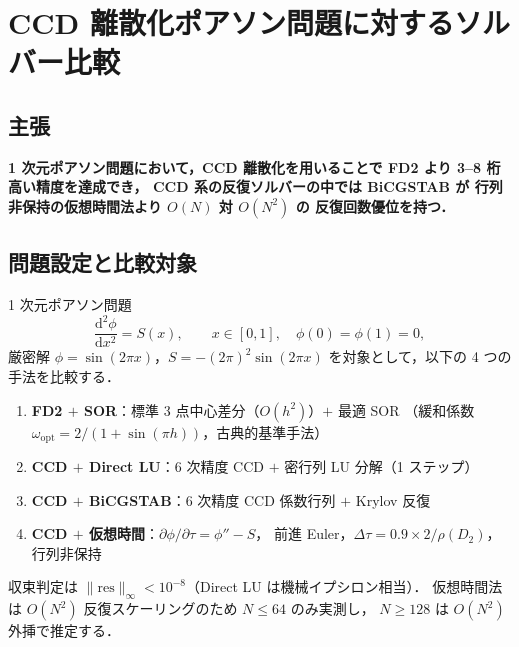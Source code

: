 %

\section{CCD 離散化ポアソン問題に対するソルバー比較}
\label{app:ccd_solver_benchmark}

\subsection{主張}

\begin{center}
\textbf{%
  1 次元ポアソン問題において，CCD 離散化を用いることで%
  FD2 より 3--8 桁高い精度を達成でき，%
  CCD 系の反復ソルバーの中では BiCGSTAB が%
  行列非保持の仮想時間法より $O(N)$ 対 $O(N^2)$ の%
  反復回数優位を持つ．}
\end{center}

\subsection{問題設定と比較対象}

1 次元ポアソン問題
\begin{equation}
  \frac{\mathrm{d}^2\phi}{\mathrm{d}x^2} = S(x),
  \qquad x \in [0,1],\quad \phi(0)=\phi(1)=0,
  \label{eq:bench_poisson}
\end{equation}
厳密解 $\phi = \sin(2\pi x)$，$S = -(2\pi)^2\sin(2\pi x)$
を対象として，以下の 4 つの手法を比較する．

\begin{enumerate}
  \item \textbf{FD2 $+$ SOR}：標準 3 点中心差分（$O(h^2)$）$+$ 最適 SOR
        （緩和係数 $\omega_{\mathrm{opt}} = 2/(1+\sin(\pi h))$，古典的基準手法）
  \item \textbf{CCD $+$ Direct LU}：6 次精度 CCD $+$ 密行列 LU 分解（1 ステップ）
  \item \textbf{CCD $+$ BiCGSTAB}：6 次精度 CCD 係数行列 $+$ Krylov 反復
  \item \textbf{CCD $+$ 仮想時間}：$\partial\phi/\partial\tau = \phi'' - S$，
        前進 Euler，$\Delta\tau = 0.9 \times 2/\rho(D_2)$，行列非保持
\end{enumerate}

収束判定は $\|\mathrm{res}\|_\infty < 10^{-8}$（Direct LU は機械イプシロン相当）．
仮想時間法は $O(N^2)$ 反復スケーリングのため $N \leq 64$ のみ実測し，
$N \geq 128$ は $O(N^2)$ 外挿で推定する．

